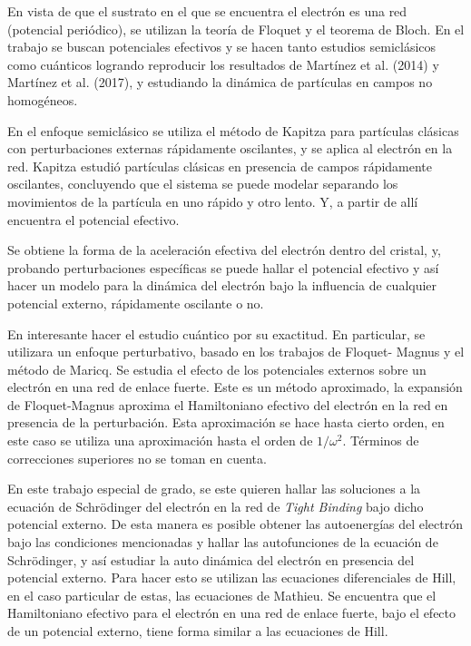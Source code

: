 En vista de que el sustrato en el que se encuentra el electrón es una red (potencial periódico), se utilizan la teoría de Floquet y el teorema de Bloch. En el trabajo se buscan potenciales efectivos y se hacen tanto estudios semiclásicos como cuánticos logrando reproducir los resultados de Martínez et al. (2014) \cite{mart2014} y  Martínez et al. (2017), y estudiando la dinámica de partículas en campos no homogéneos.

En el enfoque semiclásico se utiliza el método de Kapitza para partículas clásicas con perturbaciones externas rápidamente oscilantes, y se aplica al electrón en la red. Kapitza estudió partículas clásicas en presencia de campos rápidamente oscilantes, concluyendo que el sistema se puede modelar separando los movimientos de la partícula en uno rápido y otro lento. Y, a partir de allí encuentra el potencial efectivo.

Se obtiene la forma de la aceleración efectiva del electrón dentro del cristal, y, probando perturbaciones específicas se puede hallar el potencial efectivo y así hacer un modelo para la dinámica del electrón bajo la influencia de  cualquier potencial externo, rápidamente oscilante o no. 

En interesante hacer el estudio cuántico por su exactitud. En particular, se utilizara un enfoque perturbativo, basado en los trabajos de Floquet- Magnus y el método de Maricq.  Se estudia el efecto de los potenciales externos sobre un electrón en una red de enlace fuerte. Este es un método aproximado, la expansión de Floquet-Magnus aproxima el Hamiltoniano efectivo del electrón en la red en presencia de la perturbación. Esta aproximación se hace hasta cierto orden, en este caso se utiliza una aproximación hasta el orden de $1/\omega^2$. Términos de correcciones superiores no se toman en cuenta. 

En este trabajo especial de grado, se este quieren hallar las soluciones a la ecuación de Schrödinger del electrón en la red de \textit{Tight Binding} bajo dicho potencial externo. De esta manera es posible obtener las autoenergías del electrón bajo las condiciones mencionadas y hallar las autofunciones de la ecuación de Schrödinger, y así estudiar la auto dinámica del electrón en presencia del potencial externo. Para hacer esto se utilizan las ecuaciones diferenciales de Hill, en el caso particular de estas, las ecuaciones de Mathieu.  Se encuentra que el Hamiltoniano efectivo para el electrón en una red de enlace fuerte, bajo el efecto de un potencial externo, tiene forma similar a las ecuaciones de Hill.

